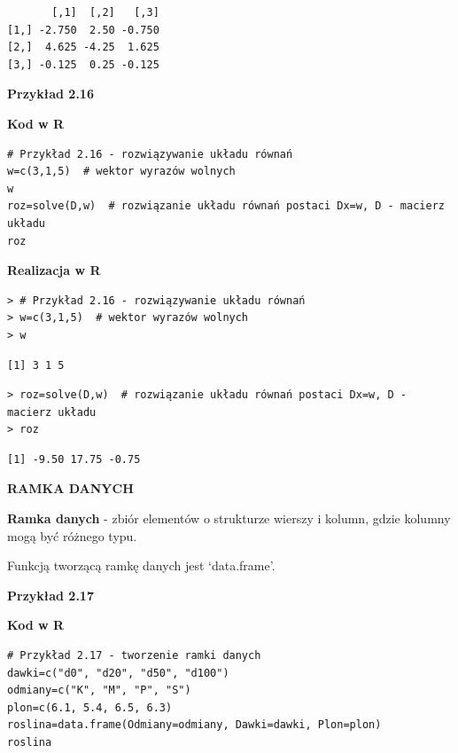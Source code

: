 \documentclass[12pt,B5paper,]{book}
\begin{document}
\begin{verbatim}
       [,1]  [,2]   [,3]
[1,] -2.750  2.50 -0.750
[2,]  4.625 -4.25  1.625
[3,] -0.125  0.25 -0.125
\end{verbatim}

\vspace{0.8cm} \textbf{Przykład 2.16}

\textbf{Kod w R}

\begin{verbatim}
# Przykład 2.16 - rozwiązywanie układu równań
w=c(3,1,5)  # wektor wyrazów wolnych
w
roz=solve(D,w)  # rozwiązanie układu równań postaci Dx=w, D - macierz układu
roz
\end{verbatim}

\newpage

\textbf{Realizacja w R}

\begin{verbatim}
> # Przykład 2.16 - rozwiązywanie układu równań
> w=c(3,1,5)  # wektor wyrazów wolnych
> w
\end{verbatim}

\begin{verbatim}
[1] 3 1 5
\end{verbatim}

\begin{verbatim}
> roz=solve(D,w)  # rozwiązanie układu równań postaci Dx=w, D - macierz układu
> roz
\end{verbatim}

\begin{verbatim}
[1] -9.50 17.75 -0.75
\end{verbatim}

\vspace{0.8cm}

\textbf{RAMKA DANYCH}

\textbf{Ramka danych} - zbiór elementów o strukturze wierszy i kolumn,
gdzie kolumny mogą być różnego typu.

Funkcją tworzącą ramkę danych jest `data.frame'.

\vspace{0.8cm} \textbf{Przykład 2.17}

\textbf{Kod w R}

\begin{verbatim}
# Przykład 2.17 - tworzenie ramki danych
dawki=c("d0", "d20", "d50", "d100")
odmiany=c("K", "M", "P", "S")
plon=c(6.1, 5.4, 6.5, 6.3)
roslina=data.frame(Odmiany=odmiany, Dawki=dawki, Plon=plon)
roslina
\end{verbatim}
\end{document}
